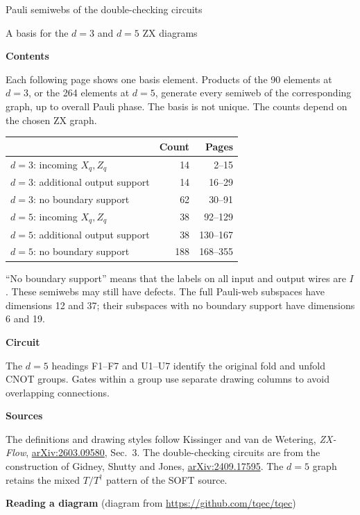 \documentclass[11pt]{article}
\begin{document}
\begin{semiwebaddition}
{\LARGE Pauli semiwebs of the double-checking circuits}\par
\medskip
{\large A basis for the $d=3$ and $d=5$ ZX diagrams}
\bigskip

\begin{minipage}[t]{.47\linewidth}
\textbf{Contents}

Each following page shows one basis element. Products of the 90 elements
at $d=3$, or the 264 elements at $d=5$, generate every semiweb of the
corresponding graph, up to overall Pauli phase. The basis is not unique.
The counts depend on the chosen ZX graph.

\medskip
\begin{tabular}{lrr}
\toprule
 & Count & Pages\\
\midrule
$d=3$: incoming $X_q,Z_q$ &14&2--15\\
$d=3$: additional output support &14&16--29\\
$d=3$: no boundary support &62&30--91\\
$d=5$: incoming $X_q,Z_q$ &38&92--129\\
$d=5$: additional output support &38&130--167\\
$d=5$: no boundary support &188&168--355\\
\bottomrule
\end{tabular}

\medskip
``No boundary support'' means that the labels on all input and output
wires are $I$. These semiwebs may still have defects. The full Pauli-web
subspaces have dimensions 12 and 37; their subspaces with no boundary
support have dimensions 6 and 19.

\medskip
\textbf{Circuit}

The $d=5$ headings F1--F7 and U1--U7 identify the original fold and
unfold CNOT groups. Gates within a group use separate drawing columns
to avoid overlapping connections.

\medskip
\textbf{Sources}

The definitions and drawing styles follow Kissinger and van de Wetering,
\emph{ZX-Flow}, \href{https://arxiv.org/abs/2603.09580}{arXiv:2603.09580},
Sec.~3. The double-checking circuits are from the construction of Gidney,
Shutty and Jones, \href{https://arxiv.org/abs/2409.17595}{arXiv:2409.17595}.
The $d=5$ graph retains the mixed $T/T^\dagger$ pattern of the SOFT source.
\end{minipage}\hfill
\begin{minipage}[t]{.49\linewidth}
\textbf{Reading a diagram} (diagram from \url{https://github.com/tqec/tqec})


\end{minipage}
\end{semiwebaddition}
\end{document}
